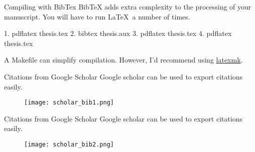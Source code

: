\begin{frame}{Compiling with BibTex}
  BibTeX adds extra complexity to the processing of your manuscript. You will
  have to run \LaTeX\ a number of times.

  \alert{1.} pdflatex thesis.tex
  \alert{2.} bibtex thesis.\alert{aux}
  \alert{3.} pdflatex thesis.tex
  \alert{4.} pdflatex thesis.tex

  A Makefile can simplify compilation. However, I'd recommend using
  \href{https://ctan.org/pkg/latexmk?lang=en}{latexmk}.
\end{frame}

\begin{frame}{Citations from Google Scholar}
  Google scholar can be used to export citations easily.
  \begin{figure}
	  \centering
    \texttt{[image: scholar\_bib1.png]}
  \end{figure}
\end{frame}

\begin{frame}{Citations from Google Scholar}
Google scholar can be used to export citations easily.
  \begin{figure}
  	\centering
  	\texttt{[image: scholar\_bib2.png]}
  \end{figure}
\end{frame}

